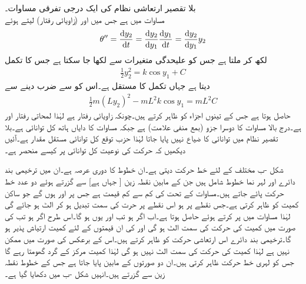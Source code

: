 \quad بلا تقصیر ارتعاشی نظام کی ایک درجی تفرقی مساوات۔\\
مساوات  میں  ہے جس میں  اور   (زاویائی رفتار) لیتے ہوئے
\begin{align*}
\theta''=\frac{\dif y_2}{\dif t}=\frac{\dif y_2}{\dif y_1}\frac{\dif y_1}{\dif t}=\frac{\dif y_2}{\dif y_1}y_2
\end{align*}
لکھ کر  ملتا ہے جس کو علیحدگی متغیرات سے  لکھا جا سکتا ہے جس کا تکمل
\begin{align}\label{مساوات_نظام_کل_توانائی_الف}
\frac{1}{2}y_2^2=k\cos y_1+C 
\end{align}
دیتا ہے جہاں  تکمل کا مستقل ہے۔اس کو  سے ضرب دینے سے
\begin{align*}
\frac{1}{2}m(Ly_2)^2-mL^2k\cos y_1=mL^2C
\end{align*}
حاصل ہوتا ہے جس کے تینوں اجزاء  کو ظاہر کرتے ہیں۔چونکہ  زاویائی رفتار ہے لہٰذا  لمحاتی رفتار اور    ہے۔درج بالا مساوات کا دوسرا جزو (بمع منفی علامت)  ہے جبکہ مساوات کا دایاں ہاتھ  کل توانائی ہے۔بلا تقصیر نظام میں توانائی کا ضیاع نہیں پایا جاتا لہٰذا حزب توقع کل توانائی مستقل مقدار ہے۔آئیں دیکھیں کہ حرکت کی نوعیت کل توانائی پر کیسے منحصر ہے۔

شکل -ب مختلف  کے لئے خط حرکت دیتی ہے۔ان خطوط کا دوری عرصہ  ہے۔ان میں ترخیمی بند دائرے اور  لہر نما خطوط شامل ہیں جن کے مابین نقطہ زین [ جہاں  ہے] سے گزرتے ہوئے دو عدد خط حرکت  پائے جاتے ہیں۔مساوات  کے تحت  کی کم سے کم قیمت  ہے جس پر  اور  ہوں گے جو ساکن کمیت کو ظاہر کرتی ہے۔جس نقطے پر  ہو اس نقطے پر حرت کی سمت تبدیل ہو کر الٹ ہو جائے گی لہٰذا مساوات  میں  پر کرتے ہوئے  حاصل ہوتا ہے۔اب اگر  ہو تب  اور یوں  ہو گا۔اس طرح اگر  ہو تب  کی صورت میں کمیت کی حرکت کی سمت الٹ ہو گی اور  کی ان قیمتوں  کے لئے کمیت ارتیاش پذیر ہو گا۔ترخیمی بند دائرے اس ارتعاشی حرکت کو ظاہر کرتے ہیں۔اس کے برعکس  کی صورت میں  ممکن نہیں ہے لہٰذا کمیت کی حرکت کی سمت الٹ نہیں ہو گی لہٰذا کمیت مرکز کے گرد گھومتا رہے گا جس کو لہری خط حرکت ظاہر کرتی ہیں۔ان دو صورتوں کے مابین  پایا جاتا ہے جس کے خطوط نقطہ زین  سے گزرتے ہیں۔انہیں شکل -ب  میں دکھایا گیا ہے۔

